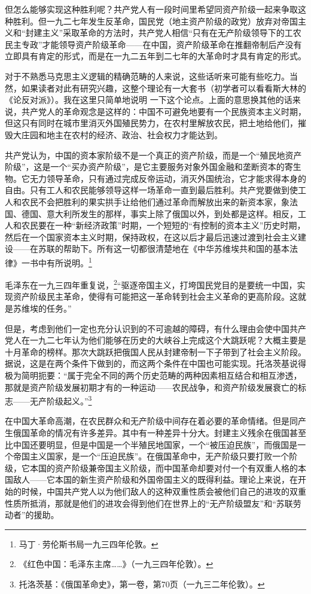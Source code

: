 \documentclass[10pt]{book}
\begin{document}
但怎么能够实现这种胜利呢？共产党人有一段时间里希望同资产阶级一起来争取这种胜利。但一九二七年发生反革命，国民党（地主资产阶级的政党）放弃对帝国主义和“封建主义”采取革命的方法时，共产党人相信“只有在无产阶级领导下的工农民主专政”才能领导资产阶级革命——在中国，资产阶级革命在推翻帝制后产没有立即具有肯定的形式，而是在一九二五年到二七年的大革命时才具有肯定的形式。

对于不熟悉马克思主义逻辑的精确范畴的人来说，这些话听来可能有些吃力。当然，如果读者对此有研究兴趣，这整个理论有一大套书（初学者可以看看斯大林的《论反对派》）。我在这里只简单地说明 一下这个论点。上面的意思换其他的话来说，共产党人的革命观念是这样的：中国不可避免地要有一个民族资本主义时期，但这只有同时在城市里消灭外国殖民势力，在农村里解放农民，把土地给他们，摧毁大庄园和地主在农村的经济、政治、社会权力才能达到。

共产党认为，中国的资本家阶级不是一个真正的资产阶级，而是一个“殖民地资产阶级”，这是一个“买办资产阶级”，是它主要服务对象外国金融和垄断资本的寄生物。它无力领导革命，只有通过完成反帝运动，消灭外国统治，它才能求得本身的自由。只有工人和农民能够领导这样一场革命一直到最后胜利。共产党要做到使工人和农民不会把胜利的果实拱手让给他们通过革命而解放出来的新资本家，象法国、德国、意大利所发生的那样，事实上除了俄国以外，到处都是这样。相反，工人和农民要在一种“新经济政策”时期，一个短短的“有控制的资本主义”历史时期，然后在一个国家资本主义时期，保持政权，在这以后才最后迅速过渡到社会主义建设——在苏联的帮助下。所有这一切都很清楚地在《中华苏维埃共和国的基本法律》一书中有所说明。\footnote{马丁·劳伦斯书局一九三四年伦敦。}

毛泽东在一九三四年重复说，\footnote{《红色中国：毛泽东主席……》（一九三四年伦敦）。}“驱逐帝国主义，打垮国民党目的是要统一中国，实现资产阶级民主革命，使得有可能把这一革命转到社会主义革命的更高阶段。这就是苏维埃的任务。”

但是，考虑到他们一定也充分认识到的不可逾越的障碍，有什么理由会使中国共产党人在一九二七年认为他们能够在历史的大峡谷上完成这个大跳跃呢？大概主要是十月革命的榜样。那次大跳跃把俄国人民从封建帝制一下子带到了社会主义阶段。据说，这是在两个条件下做到的，而这两个条件在中国也可能实现。托洛茨基说得极为简明扼要：“属于完全不同的两个历史范畴的两种因素相互结合和相互渗透，那就是资产阶级发展初期才有的一种运动——农民战争，和资产阶级发展衰亡的标志——无产阶级起义。”\footnote{托洛茨基：《俄国革命史》，第一卷，第70页（一九三二年伦敦）。}

在中国大革命高潮，在农民群众和无产阶级中间存在着必要的革命情绪。但是同产生俄国革命的情况有许多差异。其中有一种差异十分大。封建主义残余在俄国甚至比中国还要明显，但是中国是一个半殖民地国家，一个“被压迫民族”，而俄国是一个帝国主义国家，是一个“压迫民族”。在俄国革命中，无产阶级只要打败一个阶级，它本国的资产阶级兼帝国主义阶级，而中国革命却要对付一个有双重人格的本国敌人——它本国的新生资产阶级和外国帝国主义的既得利益。理论上来说，在开始的时候，中国共产党人以为他们敌人的这种双重性质会被他们自己的进攻的双重性质所抵消，那就是他们的进攻会得到他们在世界上的“无产阶级盟友”和“苏联劳动者”的援助。
\end{document}
